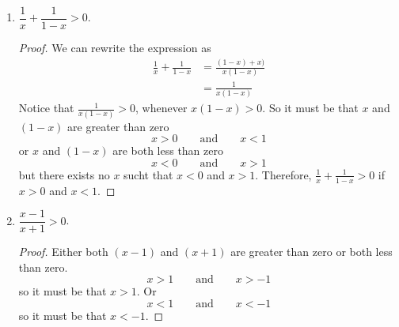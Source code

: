 \begin{exercise}[\textbf{4}]
\begin{enumerate}
         \item $\dfrac{1}{x}+\dfrac{1}{1-x}>0$.
         \begin{proof} We can rewrite the expression as
              \begin{align*}
                  \frac{1}{x} + \frac{1}{1-x} &= \frac{(1-x)+x)}{x(1-x)} \\ 
                  &= \frac{1}{x(1-x)}
              \end{align*}
              Notice that $\frac{1}{x(1-x)}>0$, whenever $x(1-x)>0$. So it must
              be that $x$ and $(1-x)$ are greater than zero
              \begin{equation*}
                  x>0 \qquad \text{and} \qquad x<1
              \end{equation*}
              or $x$ and $(1-x)$ are both less than zero
              \begin{equation*}
                  x<0 \qquad \text{and} \qquad x>1
              \end{equation*}
              but there exists no $x$ sucht that $x<0$ and $x>1$. Therefore,
              $\frac{1}{x}+\frac{1}{1-x}>0$ if $x>0$ and $x<1$.
         \end{proof}

         \item $\dfrac{x-1}{x+1}>0$.
         \begin{proof} Either both $(x-1)$ and $(x+1)$ are greater than zero or
         both less than zero.
         \begin{equation*}
             x > 1 \qquad \text{and} \qquad x>-1
         \end{equation*}
         so it must be that $x>1$. Or 
         \begin{equation*}
             x<1 \qquad \text{and} \qquad x<-1
         \end{equation*}
         so it must be that $x<-1$. 
         \end{proof}
     \end{enumerate}
\end{exercise}
\pagebreak
